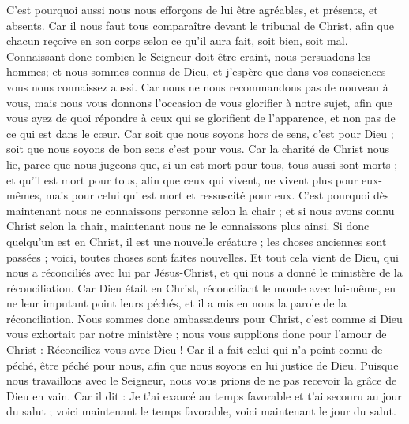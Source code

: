 \begin{multicols}{2}
C'est pourquoi aussi nous nous efforçons de lui être agréables, et présents, et absents.
Car il nous faut tous comparaître devant le tribunal de Christ, afin que chacun reçoive en son corps selon ce qu'il aura fait, soit bien, soit mal.
Connaissant donc combien le Seigneur doit être craint, nous persuadons les hommes; et nous sommes connus de Dieu, et j’espère que dans vos consciences vous nous connaissez aussi.
Car nous ne nous recommandons pas de nouveau à vous, mais nous vous donnons l'occasion de vous glorifier à notre sujet, afin que vous ayez de quoi répondre à ceux qui se glorifient de l'apparence, et non pas de ce qui est dans le cœur.
Car soit que nous soyons hors de sens, c’est pour Dieu ; soit que nous soyons de bon sens c’est pour vous.
Car la charité de Christ nous lie, parce que nous jugeons que, si un est mort pour tous, tous aussi sont morts ;
et qu'il est mort pour tous, afin que ceux qui vivent, ne vivent plus pour eux-mêmes, mais pour celui qui est mort et ressuscité pour eux.
C'est pourquoi dès maintenant nous ne connaissons personne selon la chair ; et si nous avons connu Christ selon la chair, maintenant nous ne le connaissons plus ainsi.
Si donc quelqu'un est en Christ, il est une nouvelle créature ; les choses anciennes sont passées ; voici, toutes choses sont faites nouvelles.
Et tout cela vient de Dieu, qui nous a réconciliés avec lui par Jésus-Christ, et qui nous a donné le ministère de la réconciliation.
Car Dieu était en Christ, réconciliant le monde avec lui-même, en ne leur imputant point leurs péchés, et il a mis en nous la parole de la réconciliation.
Nous sommes donc ambassadeurs pour Christ, c'est comme si Dieu vous exhortait par notre ministère ; nous vous supplions donc pour l’amour de Christ : Réconciliez-vous avec Dieu !
Car il a fait celui qui n'a point connu de péché, être péché pour nous, afin que nous soyons en lui justice de Dieu.
\VerseOne{}Puisque nous travaillons avec le Seigneur, nous vous prions de ne pas recevoir la grâce de Dieu en vain.
Car il dit : Je t'ai exaucé au temps favorable et t'ai secouru au jour du salut ; voici maintenant le temps favorable, voici maintenant le jour du salut.

\end{multicols}

